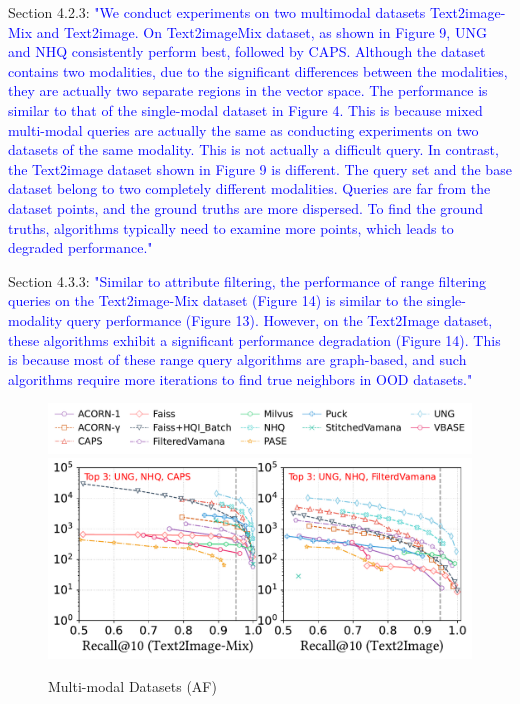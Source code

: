 \documentclass[sigconf, nonacm]{acmart}
\begin{document}
Section 4.2.3: \textcolor{blue}{
	"We conduct experiments on two multimodal datasets Text2image-Mix and Text2image. On Text2imageMix dataset, as shown in Figure 9, UNG and NHQ consistently perform best, followed by CAPS. Although the dataset contains two modalities, due to the significant differences between the modalities, they are actually two separate regions in the vector space. The performance is similar to that of the single-modal dataset in Figure 4. This is because mixed multi-modal queries are actually the same as conducting experiments on two datasets of the same modality. This is not actually a difficult query. In contrast, the Text2image dataset shown in Figure 9 is different. The query set and the base dataset belong to two completely different modalities. Queries are far from the dataset points, and the ground truths are more dispersed. To find the ground truths, algorithms typically need to examine more points, which leads to degraded performance." 
}

Section 4.3.3: \textcolor{blue}{
		"Similar to attribute filtering, the performance of range filtering queries on the Text2image-Mix dataset (Figure 14) is similar to the single-modality query performance (Figure 13). However, on the Text2Image dataset, these algorithms exhibit a significant performance degradation (Figure 14). This is because most of these range query algorithms are graph-based, and such algorithms require more iterations to find true neighbors in OOD datasets."
}

\begin{figure}[htbp]
	\centering
	\includegraphics[width=0.95\linewidth]{fig/attribute_legend.pdf}
	\includegraphics[width=\linewidth]{fig/attribute_multimodel_2.pdf}
	\caption{Multi-modal Datasets (AF)}
	\label{fig:attribute_multimodel}
\end{figure}
\end{document}
